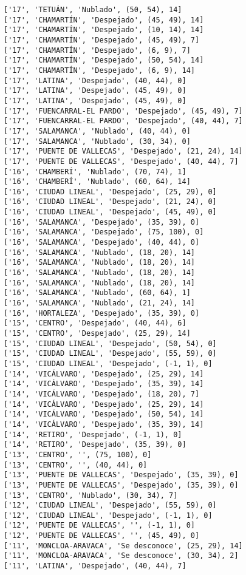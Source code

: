 \documentclass[11pt]{article}
\begin{document}
\begin{Verbatim}[commandchars=\\\{\}]
['17', 'TETUÁN', 'Nublado', (50, 54), 14]
['17', 'CHAMARTÍN', 'Despejado', (45, 49), 14]
['17', 'CHAMARTÍN', 'Despejado', (10, 14), 14]
['17', 'CHAMARTÍN', 'Despejado', (45, 49), 7]
['17', 'CHAMARTÍN', 'Despejado', (6, 9), 7]
['17', 'CHAMARTÍN', 'Despejado', (50, 54), 14]
['17', 'CHAMARTÍN', 'Despejado', (6, 9), 14]
['17', 'LATINA', 'Despejado', (40, 44), 0]
['17', 'LATINA', 'Despejado', (45, 49), 0]
['17', 'LATINA', 'Despejado', (45, 49), 0]
['17', 'FUENCARRAL-EL PARDO', 'Despejado', (45, 49), 7]
['17', 'FUENCARRAL-EL PARDO', 'Despejado', (40, 44), 7]
['17', 'SALAMANCA', 'Nublado', (40, 44), 0]
['17', 'SALAMANCA', 'Nublado', (30, 34), 0]
['17', 'PUENTE DE VALLECAS', 'Despejado', (21, 24), 14]
['17', 'PUENTE DE VALLECAS', 'Despejado', (40, 44), 7]
['16', 'CHAMBERÍ', 'Nublado', (70, 74), 1]
['16', 'CHAMBERÍ', 'Nublado', (60, 64), 14]
['16', 'CIUDAD LINEAL', 'Despejado', (25, 29), 0]
['16', 'CIUDAD LINEAL', 'Despejado', (21, 24), 0]
['16', 'CIUDAD LINEAL', 'Despejado', (45, 49), 0]
['16', 'SALAMANCA', 'Despejado', (35, 39), 0]
['16', 'SALAMANCA', 'Despejado', (75, 100), 0]
['16', 'SALAMANCA', 'Despejado', (40, 44), 0]
['16', 'SALAMANCA', 'Nublado', (18, 20), 14]
['16', 'SALAMANCA', 'Nublado', (18, 20), 14]
['16', 'SALAMANCA', 'Nublado', (18, 20), 14]
['16', 'SALAMANCA', 'Nublado', (18, 20), 14]
['16', 'SALAMANCA', 'Nublado', (60, 64), 1]
['16', 'SALAMANCA', 'Nublado', (21, 24), 14]
['16', 'HORTALEZA', 'Despejado', (35, 39), 0]
['15', 'CENTRO', 'Despejado', (40, 44), 6]
['15', 'CENTRO', 'Despejado', (25, 29), 14]
['15', 'CIUDAD LINEAL', 'Despejado', (50, 54), 0]
['15', 'CIUDAD LINEAL', 'Despejado', (55, 59), 0]
['15', 'CIUDAD LINEAL', 'Despejado', (-1, 1), 0]
['14', 'VICÁLVARO', 'Despejado', (25, 29), 14]
['14', 'VICÁLVARO', 'Despejado', (35, 39), 14]
['14', 'VICÁLVARO', 'Despejado', (18, 20), 7]
['14', 'VICÁLVARO', 'Despejado', (25, 29), 14]
['14', 'VICÁLVARO', 'Despejado', (50, 54), 14]
['14', 'VICÁLVARO', 'Despejado', (35, 39), 14]
['14', 'RETIRO', 'Despejado', (-1, 1), 0]
['14', 'RETIRO', 'Despejado', (35, 39), 0]
['13', 'CENTRO', '', (75, 100), 0]
['13', 'CENTRO', '', (40, 44), 0]
['13', 'PUENTE DE VALLECAS', 'Despejado', (35, 39), 0]
['13', 'PUENTE DE VALLECAS', 'Despejado', (35, 39), 0]
['13', 'CENTRO', 'Nublado', (30, 34), 7]
['12', 'CIUDAD LINEAL', 'Despejado', (55, 59), 0]
['12', 'CIUDAD LINEAL', 'Despejado', (-1, 1), 0]
['12', 'PUENTE DE VALLECAS', '', (-1, 1), 0]
['12', 'PUENTE DE VALLECAS', '', (45, 49), 0]
['11', 'MONCLOA-ARAVACA', 'Se desconoce', (25, 29), 14]
['11', 'MONCLOA-ARAVACA', 'Se desconoce', (30, 34), 2]
['11', 'LATINA', 'Despejado', (40, 44), 7]

\end{Verbatim}
\end{document}
